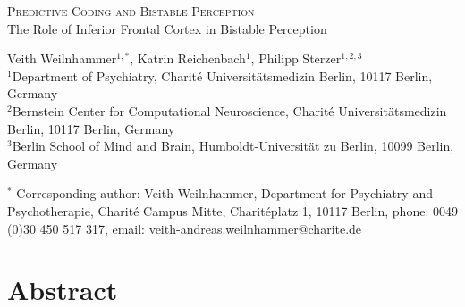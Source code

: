 \documentclass[12pt]{article}
\date{}
\begin{document}
\renewcommand{\baselinestretch}{2}

\begin{center}\normalsize\textsc{Predictive Coding and Bistable Perception}\\
\LARGE The Role of Inferior Frontal Cortex in Bistable Perception\\\vspace*{24pt}


\large Veith Weilnhammer$^{1,\ast}$, Katrin Reichenbach$^{1}$, Philipp Sterzer$^{1, 2, 3} $\vspace*{24pt}\\
\footnotesize$^{1}$Department of Psychiatry, Charit\'{e} Universit\"{a}tsmedizin Berlin, 10117 Berlin, Germany\\

$^{2}$Bernstein Center for Computational Neuroscience, Charit\'{e} Universit\"{a}tsmedizin Berlin, 10117 Berlin, Germany\\
$^{3}$Berlin School of Mind and Brain, Humboldt-Universit\"{a}t zu Berlin, 10099 Berlin, Germany\\ \vfill

{\begin{minipage}[b]{\textwidth} $^\ast$	
Corresponding author:  Veith Weilnhammer, Department for Psychiatry and Psychotherapie, Charit\'{e} Campus Mitte, Charit\'{e}platz 1, 10117 Berlin, phone: 0049 (0)30 450 517 317, email: veith-andreas.weilnhammer@charite.de\\ 
\end{minipage}}
\end{center}


\linenumbers

\renewcommand{\baselinestretch}{1.5}\normalsize

\clearpage
\section*{Abstract}
\end{document}
